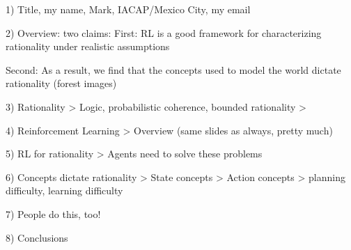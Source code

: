 1) Title, my name, Mark, IACAP/Mexico City, my email

2) Overview: two claims:
    First: RL is a good framework for characterizing rationality under realistic assumptions
    
    Second: As a result, we find that the concepts used to model the world dictate rationality (forest images)
    
3) Rationality
    > Logic, probabilistic coherence, bounded rationality
    > 
    
4) Reinforcement Learning
    > Overview (same slides as always, pretty much)
    
5) RL for rationality
    > Agents need to solve these problems
    
    
6) Concepts dictate rationality
    > State concepts
    > Action concepts
    > planning difficulty, learning difficulty
    
7) People do this, too!


8) Conclusions